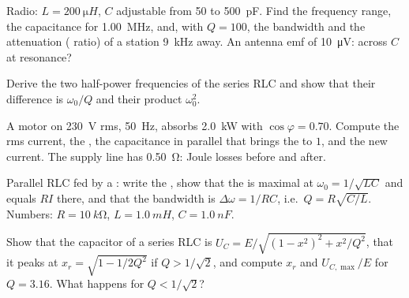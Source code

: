 \begin{exercise}[$\star\star$]\label{exo:b1:sinusoidal-impedance:7}
Radio: $L = \qty{200}{\micro H}$, $C$ adjustable from \qty{50}{} to
\qty{500}{pF}. Find the frequency range, the capacitance for
\qty{1.00}{MHz}, and, with $Q = 100$, the bandwidth and the attenuation
( ratio) of a station \qty{9}{kHz} away. An antenna emf of
\qty{10}{\micro V}:  across $C$ at resonance?
\end{exercise}

\begin{exercise}[$\star\star$]\label{exo:b1:sinusoidal-impedance:8}
Derive the two half-power frequencies of the series RLC and show that
their difference is $\omega_0/Q$ and their product $\omega_0^2$.
\end{exercise}

\begin{exercise}[$\star\star$]\label{exo:b1:sinusoidal-impedance:9}
A motor on \qty{230}{V} rms, \qty{50}{Hz}, absorbs \qty{2.0}{kW} with
$\cos\varphi = 0.70$. Compute the rms current, the , the
capacitance in parallel that brings the  to $1$, and the
new current. The supply line has \qty{0.50}{\ohm}: Joule losses before
and after.
\end{exercise}

\begin{exercise}[$\star\star\star$]\label{exo:b1:sinusoidal-impedance:10}
Parallel RLC fed by a : write the , show that
the  is maximal at $\omega_0 = 1/\sqrt{LC}$ and equals $RI$
there, and that the bandwidth is $\Delta\omega = 1/RC$, i.e.\ $Q =
R\sqrt{C/L}$. Numbers: $R = \qty{10}{k\ohm}$, $L = \qty{1.0}{mH}$,
$C = \qty{1.0}{nF}$.
\end{exercise}

\begin{exercise}[$\star\star\star$]\label{exo:b1:sinusoidal-impedance:11}
Show that the capacitor  of a series RLC is $U_C = E/\sqrt{(1 -
x^2)^2 + x^2/Q^2}$, that it peaks at $x_r = \sqrt{1 - 1/2Q^2}$ if
$Q > 1/\sqrt2$, and compute $x_r$ and $U_{C,\max}/E$ for $Q = 3.16$.
What happens for $Q < 1/\sqrt2$?
\end{exercise}

